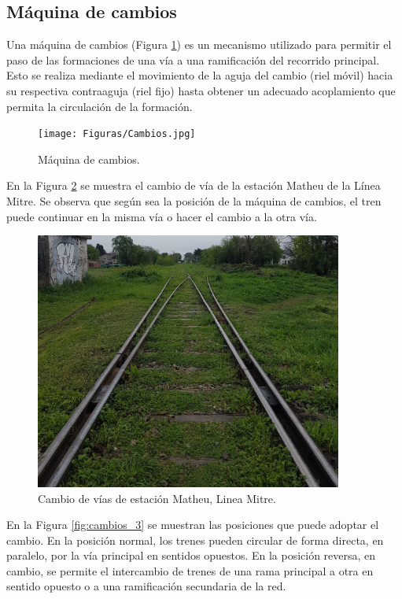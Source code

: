 \subsection{Máquina de cambios}
    \label{sec:switches}
 
    Una máquina de cambios (Figura \ref{fig:cambios_1}) es un mecanismo utilizado para permitir el paso de las formaciones de una vía a una ramificación del recorrido principal. Esto se realiza mediante el movimiento de la aguja del cambio (riel móvil) hacia su respectiva contraaguja (riel fijo) hasta obtener un adecuado acoplamiento que permita la circulación de la formación.

    \begin{figure}[H]
        \centering
        \texttt{[image: Figuras/Cambios.jpg]}
        \centering\caption{Máquina de cambios.}
        \label{fig:cambios_1}
    \end{figure}

    En la Figura \ref{fig:cambios_2} se muestra el cambio de vía de la estación Matheu de la Línea Mitre. Se observa que según sea la posición de la máquina de cambios, el tren puede continuar en la misma vía o hacer el cambio a la otra vía.

    \begin{figure}[H]
        \centering
        \includegraphics[width=0.9\textwidth]{Figuras/Cambios_2.jpg}
        \centering\caption{Cambio de vías de estación Matheu, Linea Mitre.}
        \label{fig:cambios_2}
    \end{figure}

    En la Figura \ref{fig:cambios_3} se muestran las posiciones que puede adoptar el cambio. En la posición normal, los trenes pueden circular de forma directa, en paralelo, por la vía principal en sentidos opuestos. En la posición reversa, en cambio, se permite el intercambio de trenes de una rama principal a otra en sentido opuesto o a una ramificación secundaria de la red.

